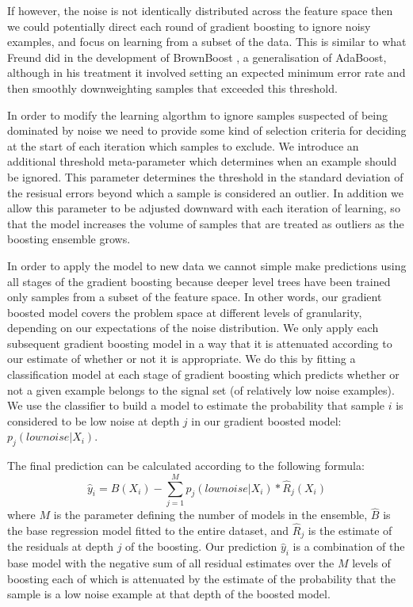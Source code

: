 \documentclass[graybox]{svmult}
\begin{document}
If however, the noise is not identically distributed across the feature space then we could potentially direct each round of
gradient boosting to ignore noisy examples, and focus on learning from a subset of the data. This is similar to what Freund
did in the development of BrownBoost \cite{Freund2001}, a generalisation of AdaBoost, although in his treatment it involved
setting an expected minimum error rate and then smoothly downweighting samples that exceeded this threshold.

In order to modify the learning algorthm to ignore samples suspected of being dominated by noise we need to provide some
kind of selection criteria for deciding at the start of each iteration which samples to exclude.
We introduce an additional threshold meta-parameter which determines when an example should be ignored. This parameter
determines the threshold in the standard deviation of the resisual errors beyond which a sample is considered an outlier.
In addition we allow this parameter to be adjusted downward with each iteration of learning, so that the model 
increases the volume of samples that are treated as outliers as the boosting ensemble grows.

In order to apply the model to new data we cannot simple make predictions using all stages of the gradient boosting because
deeper level trees have been trained only samples from a subset of the feature space. In other words, our gradient boosted model
covers the problem space at different levels of granularity, depending on our expectations of the noise distribution.
We only apply each subsequent gradient boosting model in a way that it is attenuated according to our estimate of
whether or not it is appropriate. We do this by fitting a classification model at each stage of gradient boosting which predicts
whether or not a given example belongs to the signal set (of relatively low noise examples). We use the classifier to
build a model to estimate the probability that sample $i$ is considered to be low noise at depth $j$ in our gradient 
boosted model: $p_j(low noise | X_i )$.

The final prediction can be calculated according to the following formula:
%
\begin{equation}
\hat{y}_i = \hat{B}(X_i) - \sum_{j=1}^M p_j(low noise | X_i) * \hat{R}_j(X_i)
\label{eq:pred}
\end{equation}
%
where $M$ is the parameter defining the number of models in the ensemble, $\hat{B}$ is the base regression model fitted to the
entire dataset, and $\hat{R}_j$ is the estimate of the residuals at depth $j$ of the boosting.
Our prediction $\hat{y}_i$ is a combination of the base model with the negative sum of all residual estimates over the $M$ 
levels of boosting each of which is attenuated by the estimate of the probability that the sample is a low noise example at that 
depth of the boosted model.
\end{document}
